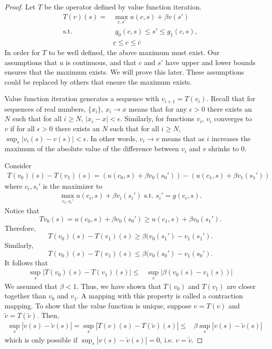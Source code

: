 \begin{proof}
  Let $T$ be the operator defined by value function iteration. 
  \begin{align*}
    T(v)(s) = & \max_{c,s'} u(c,s) + \beta v(s') \\
    \text{s.t.} & \; g_0(c,s) \leq s' \leq g_1(c,s), \\
    & \underline{c} \leq c \leq \overline{c}
  \end{align*}
  In order for $T$ to be well defined, the above maximum must exist. 
  Our assumptions that $u$ is continuous, and that $c$ and $s'$ have
  upper and lower bounds ensures that the maximum exists. We will
  prove this later. These assumptions could be replaced by others that
  ensure the maximum exists. 
  
  Value function iteration generates a sequence with $v_{i+1} =
  T(v_i)$.  Recall that for sequences of real numbers, $\{x_i\}$, $x_i
  \to x$ means that for any $\epsilon >0$ there exists an $N$ such
  that for all $i \geq N$, $|x_i - x| < \epsilon$. Similarly, for
  functions $v_i$, $v_i$ converges to $v$ if for all $\epsilon>0$
  there exists an $N$ such that for all $i \geq N$, $\sup_{s} |v_i(s)
  - v(s)| < \epsilon$. In other words, $v_i \to v$ means that as $i$
  increases the maximum of the absolute value of the difference
  between $v_i$ and $v$ shrinks to $0$. 
  
  Consider
  \begin{align*}
    T(v_0)(s)-T(v_1)(s) =  \left(u(c_0,s) + \beta v_0(s_0')  \right) -
    \left(u(c_1,s) + \beta v_1(s_1')  \right)
  \end{align*} 
  where $c_i,s_i'$ is the maximizer to 
  \begin{align*}
    \max_{c_i,s_i'} u(c_i,s) + \beta v_i(s_i') \text{ s.t. }
    s_i'=g(c_i,s).
  \end{align*}
  Notice that
  \[ T v_0 (s) = u(c_0,s) + \beta v_0(s_0')  \geq u(c_1,s) + \beta
  v_0(s_1'). \]
  Therefore,
  \[ T(v_0)(s) - T(v_1)(s) \geq \beta (v_0(s_1') - v_1(s_1'). \]
  Similarly,
  \[ T(v_0)(s)-T(v_1)(s) \leq \beta (v_0(s_0') - v_1(s_0'). \]
  It follows that
  \begin{align*}
    \sup_{s}
    \left\vert T(v_0)(s)-T(v_1)(s) \right\vert 
    \leq & \sup_s \left\vert \beta(v_0(s) -v_1(s)) \right\vert 
  \end{align*}
  We assumed that $\beta < 1$. Thus, we have shown that $T(v_0)$ and
  $T(v_1)$ are closer together than $v_0$ and $v_1$. A mapping with
  this property is called a contraction mapping. To show that the
  value function is unique, suppose $v = T(v)$ and $\tilde{v} =
  T(\tilde{v})$. Then, 
  \begin{align*}
    \sup_s \left\vert v(s) -\tilde{v}(s) \right\vert = \sup_{s}
    \left\vert T(v)(s)-T(\tilde{v})(s) \right\vert \leq & \beta \sup_s
    \left\vert v(s) -\tilde{v}(s) \right\vert
  \end{align*}
  which is only possible if $\sup_s \left\vert v(s) -\tilde{v}(s)
  \right\vert = 0$, i.e. $v = \tilde{v}$.
 

\end{proof}
